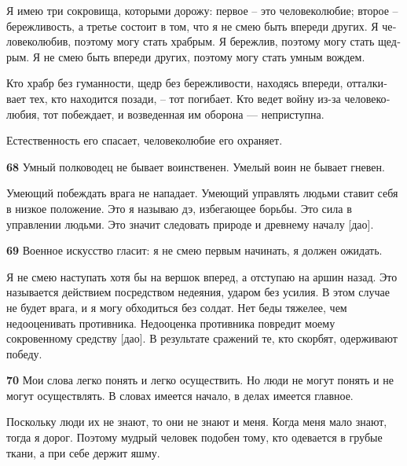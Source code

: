 \documentclass[a4paper]{article}
\begin{document}
{\ttfamily
\foreignlanguage{russian}{\textrm{Я имею три сокровища, которыми дорожу: первое – это человеколюбие; второе –
бережливость, а третье состоит в том, что я не смею быть впереди других. \newline
Я человеколюбив, поэтому могу стать храбрым. Я бережлив, поэтому могу стать щедрым. Я не смею быть впереди других,
поэтому могу стать умным вождем.}}}

{\ttfamily
\foreignlanguage{russian}{\textrm{Кто храбр без гуманности, щедр без бережливости, находясь впереди, отталкивает тех,
кто находится позади, – тот погибает. Кто ведет войну из-за человеколюбия, тот побеждает, и возведенная им оборона —
неприступна.}}}

{
Естественность его спасает, человеколюбие его охраняет.}

{\ttfamily
\foreignlanguage{russian}{\textrm{\textbf{68}}}\foreignlanguage{russian}{\textrm{ Умный полководец не бывает
воинственен. Умелый воин не бывает гневен.}}}

{
Умеющий побеждать врага не нападает. Умеющий управлять людьми ставит себя в низкое положение. Это я называю дэ,
избегающее борьбы. Это сила в управлении людьми. Это значит следовать природе и древнему началу [дао].}

{\ttfamily
\foreignlanguage{russian}{\textrm{\textbf{69}}}\foreignlanguage{russian}{\textrm{ Военное искусство гласит: я не смею
первым начинать, я должен ожидать.}}}

{
Я не смею наступать хотя бы на вершок вперед, а отступаю на аршин назад. Это называется действием посредством недеяния,
ударом без усилия. В этом случае не будет врага, и я могу обходиться без солдат. Нет беды тяжелее, чем недооценивать
противника. Недооценка противника повредит моему сокровенному средству [дао]. В результате сражений те, кто скорбят,
одерживают победу.}

{\ttfamily
\foreignlanguage{russian}{\textrm{\textbf{70}}}\foreignlanguage{russian}{\textrm{ Мои слова легко понять и легко
осуществить. Но люди не могут понять и не могут осуществлять. В словах имеется начало, в делах имеется главное.}}}

{
Поскольку люди их не знают, то они не знают и меня. Когда меня мало знают, тогда я дорог. Поэтому мудрый человек подобен
тому, кто одевается в грубые ткани, а при себе держит яшму.}
\end{document}
